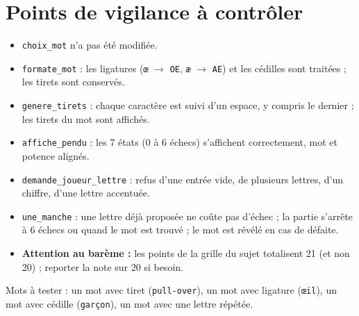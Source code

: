 \documentclass[10pt,a4paper]{article}
\begin{document}
\section*{Points de vigilance à contrôler}
\begin{itemize}
\item \texttt{choix\_mot} n'a pas été modifiée.
\item \texttt{formate\_mot} : les ligatures (\texttt{œ} $\to$ \texttt{OE}, \texttt{æ} $\to$ \texttt{AE}) et les cédilles sont traitées ; les tirets sont conservés.
\item \texttt{genere\_tirets} : chaque caractère est suivi d'un espace, y compris le dernier ; les tirets du mot sont affichés.
\item \texttt{affiche\_pendu} : les 7 états (0 à 6 échecs) s'affichent correctement, mot et potence alignés.
\item \texttt{demande\_joueur\_lettre} : refus d'une entrée vide, de plusieurs lettres, d'un chiffre, d'une lettre accentuée.
\item \texttt{une\_manche} : une lettre déjà proposée ne coûte pas d'échec ; la partie s'arrête à 6 échecs ou quand le mot est trouvé ; le mot est révélé en cas de défaite.
\item \textbf{Attention au barème :} les points de la grille du sujet totalisent 21 (et non 20) ; reporter la note sur 20 si besoin.
\end{itemize}
\smallskip
Mots à tester : un mot avec tiret (\texttt{pull-over}), un mot avec ligature (\texttt{œil}), un mot avec cédille (\texttt{garçon}), un mot avec une lettre répétée.
\end{document}
